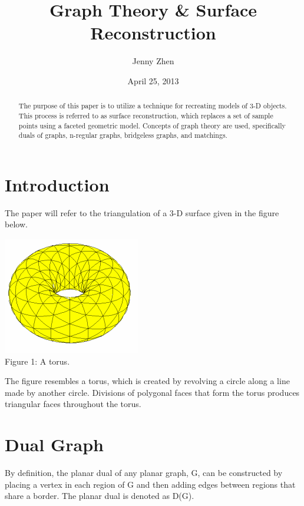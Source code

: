 \documentclass[12pt]{article}
\begin{document}
\title{Graph Theory \& Surface Reconstruction}
\author{Jenny Zhen}
\date{April 25, 2013}
\maketitle

\begin{abstract}The purpose of this paper is to utilize a technique for recreating models of 3-D objects. This process is referred to as surface reconstruction, which replaces a set of sample points using a faceted geometric model. Concepts of graph theory are used, specifically duals of graphs, n-regular graphs, bridgeless graphs, and matchings.
\end{abstract}

\begin{flushleft}
\section*{Introduction}
The paper will refer to the triangulation of a 3-D surface given in the figure below.

\begin{center}
\includegraphics[scale=1]{images/torus1.png}\\
Figure 1: A torus.
\end{center}

The figure resembles a torus, which is created by revolving a circle along a line made by another circle. Divisions of polygonal faces that form the torus produces triangular faces throughout the torus.

\section*{Dual Graph}
By definition, the planar dual of any planar graph, G, can be constructed by placing a vertex in each region of G and then adding edges between regions that share a border. The planar dual is denoted as D(G).


\end{flushleft}
\end{document}
